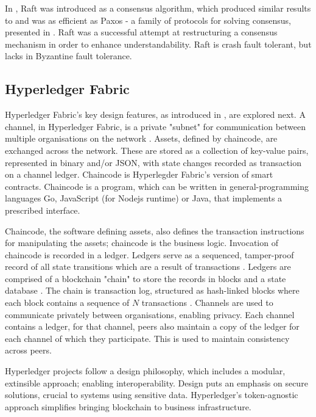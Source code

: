 In \cite{ongaro_search_2014}, Raft was introduced as a consensus algorithm, which produced similar results to and was as efficient as Paxos - a family of protocols for solving consensus, presented in \cite{pease_reaching_1980}.
Raft was a successful attempt at restructuring a consensus mechanism in order to enhance understandability. Raft is crash fault tolerant, but lacks in Byzantine fault tolerance. \cite{ongaro_search_2014} 




\subsection{Hyperledger Fabric}

Hyperledger Fabric's key design features, as introduced in \cite{androulaki_hyperledger_2018}, are explored next.
A channel, in Hyperledger Fabric, is a private "subnet" for communication between multiple organisations on the network \cite{noauthor_channels_nodate}. 
Assets, defined by chaincode, are exchanged across the network. These are stored as a collection of key-value pairs, represented in binary and/or JSON, with state changes recorded as transaction on a channel ledger. 
Chaincode is Hyperlegder Fabric's version of smart contracts. Chaincode is a program, which can be written in general-programming languages Go, JavaScript (for Nodejs runtime) or Java, that implements a prescribed interface.

Chaincode, the software defining assets, also defines the transaction instructions for manipulating the assets; chaincode is the business logic. Invocation of chaincode is recorded in a ledger.
Ledgers serve as a sequenced, tamper-proof record of all state transitions which are a result of transactions \cite{noauthor_ledger_nodate}.
Ledgers are comprised of a blockchain "chain" to store the records in blocks and a state database \cite{noauthor_hyperledger_nodate}. 
The chain is transaction log, structured as hash-linked blocks where each block contains a sequence of $N$ transactions \cite{noauthor_hyperledger_nodate}.
Channels are used to communicate privately between organisations, enabling privacy.
Each channel contains a ledger, for that channel, peers also maintain a copy of the ledger for each channel of which they participate. This is used to maintain consistency across peers. 

Hyperledger projects follow a design philosophy, which includes a modular, extinsible approach; enabling interoperability.
Design puts an emphasis on secure solutions, crucial to systems using sensitive data.
Hyperledger's token-agnostic approach simplifies bringing blockchain to business infrastructure. \cite{noauthor_hyperledger_2017}

